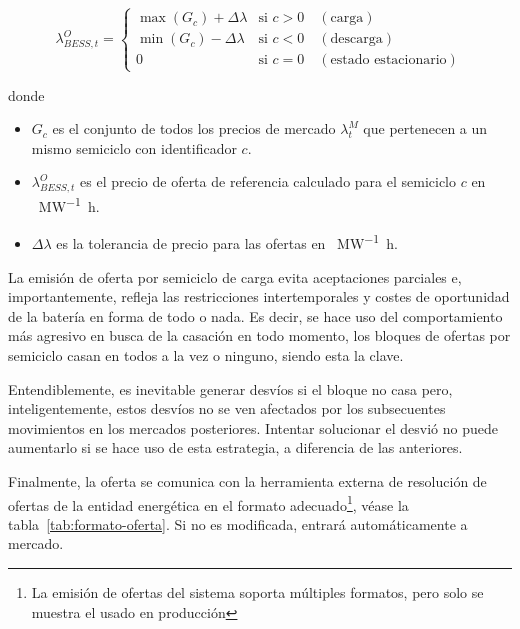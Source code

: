 \begin{samepage}

  \begin{equation}
    \lambda^{O}_{BESS, t} =
    \begin{cases}
      \max(G_{c}) + \Delta \lambda & \text{si } c > 0 \quad (\text{carga})\\
      \min(G_{c}) - \Delta \lambda & \text{si } c < 0 \quad (\text{descarga})\\
      0                            & \text{si } c = 0 \quad (\text{estado estacionario})
    \end{cases}
  \end{equation}

  donde

  \begin{itemize}

    \item \( G_{c} \) es el conjunto de todos los precios de mercado \( \lambda^{M}_{t} \) que pertenecen a un mismo semiciclo con identificador \( c \).

    \item \( \lambda^{O}_{BESS, t} \) es el precio de oferta de referencia calculado para el semiciclo \( c \) en \si{\text{\euro}\per\mega\watt\hour}.

    \item \( \Delta \lambda \) es la tolerancia de precio para las ofertas en \si{\text{\euro}\per\mega\watt\hour}.

  \end{itemize}

\end{samepage}

La emisión de oferta por semiciclo de carga evita aceptaciones parciales e, importantemente, refleja las restricciones intertemporales y costes de oportunidad de la batería en forma de todo o nada. Es decir, se hace uso del comportamiento más agresivo en busca de la casación en todo momento, los bloques de ofertas por semiciclo casan en todos a la vez o ninguno, siendo esta la clave.

Entendiblemente, es inevitable generar desvíos si el bloque no casa pero, inteligentemente, estos desvíos no se ven afectados por los subsecuentes movimientos en los mercados posteriores. Intentar solucionar el desvió no puede aumentarlo si se hace uso de esta estrategia, a diferencia de las anteriores.

Finalmente, la oferta se comunica con la herramienta externa de resolución de ofertas de la entidad energética en el formato adecuado\footnote{La emisión de ofertas del sistema soporta múltiples formatos, pero solo se muestra el usado en producción}, véase la tabla~\ref{tab:formato-oferta}. Si no es modificada, entrará automáticamente a mercado.


